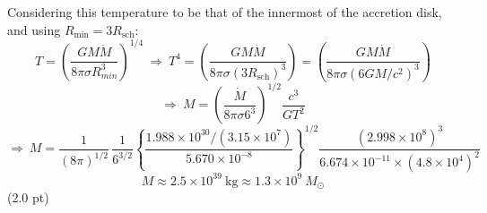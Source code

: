 \begin{description}
  Considering this temperature to be that of the innermost of the accretion
  disk, and using $R_{\min} = 3R_{\mathrm{sch}}$:
  \[ T = \left(\frac{GM\dot{M}}{8\pi\sigma R_{min}^3}\right)^{1/4}
     \ \Rightarrow\ T^4
     = \left(\frac{GM\dot{M}}{8\pi\sigma(3R_{\mathrm{sch}})^3}\right)
     = \left(\frac{GM\dot{M}}{8\pi\sigma(6GM/c^2)^3}\right) \]
  \[ \Rightarrow\ M = \left(\frac{\dot{M}}{8\pi\sigma 6^3}\right)^{1/2}
     \frac{c^3}{GT^2} \]
  \[ \Rightarrow\ M = \frac{1}{(8\pi)^{1/2}}\,\frac{1}{6^{3/2}}
     \left\{\frac{1.988\times10^{30}/(3.15\times10^7)}
       {5.670\times10^{-8}}\right\}^{1/2}
     \frac{(2.998\times10^8)^3}
       {6.674\times10^{-11}\times(4.8\times10^4)^2} \]
  \[ \boxed{M \approx 2.5\times10^{39}\ \mathrm{kg}
     \approx 1.3\times10^9\ M_\odot} \]
  \hfill(2.0 pt)
\end{description}

